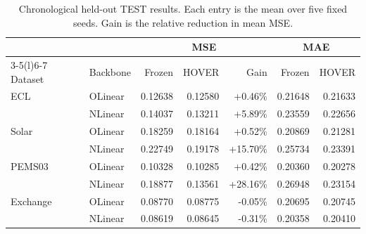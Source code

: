 \begin{table}[!t]
\caption{Chronological held-out TEST results. Each entry is the mean over five fixed seeds. Gain is the relative reduction in mean MSE.}
\label{tab:heldout}
\centering
\footnotesize
\setlength{\tabcolsep}{2.5pt}
\begin{tabular}{@{}llrrrrr@{}}
\toprule
 & & \multicolumn{3}{c}{MSE} & \multicolumn{2}{c}{MAE} \\
\cmidrule(lr){3-5}\cmidrule(l){6-7}
Dataset & Backbone & Frozen & HOVER & Gain & Frozen & HOVER \\
\midrule
ECL & OLinear & 0.12638 & 0.12580 & +0.46\% & 0.21648 & 0.21633 \\
 & NLinear & 0.14037 & 0.13211 & +5.89\% & 0.23559 & 0.22656 \\
Solar & OLinear & 0.18259 & 0.18164 & +0.52\% & 0.20869 & 0.21281 \\
 & NLinear & 0.22749 & 0.19178 & +15.70\% & 0.25734 & 0.23391 \\
PEMS03 & OLinear & 0.10328 & 0.10285 & +0.42\% & 0.20360 & 0.20278 \\
 & NLinear & 0.18877 & 0.13561 & +28.16\% & 0.26948 & 0.23154 \\
Exchange & OLinear & 0.08770 & 0.08775 & -0.05\% & 0.20695 & 0.20745 \\
 & NLinear & 0.08619 & 0.08645 & -0.31\% & 0.20358 & 0.20410 \\
\bottomrule
\end{tabular}
\end{table}
